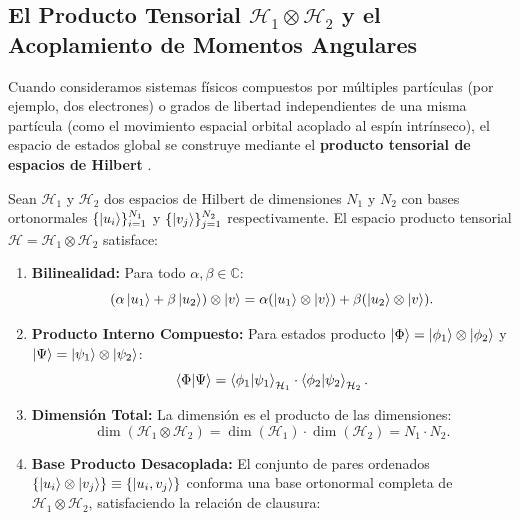 \subsection{El Producto Tensorial \texorpdfstring{$\mathcal{H}_1 \otimes \mathcal{H}_2$}{H1 x H2} y el Acoplamiento de Momentos Angulares}
\label{subsec:producto_tensorial_acoplamiento}

Cuando consideramos sistemas físicos compuestos por múltiples partículas (por ejemplo, dos electrones) o grados de libertad independientes de una misma partícula (como el movimiento espacial orbital acoplado al espín intrínseco), el espacio de estados global se construye mediante el \textbf{producto tensorial de espacios de Hilbert} \cite{sakurai, cohen}.

\begin{teoremabox}
    Sean $\mathcal{H}_1$ y $\mathcal{H}_2$ dos espacios de Hilbert de dimensiones $N_1$ y $N_2$ con bases ortonormales $\{\left| u_i \right\rangle\}_{i=1}^{N_1}$ y $\{\left| v_j \right\rangle\}_{j=1}^{N_2}$ respectivamente. El espacio producto tensorial $\mathcal{H} = \mathcal{H}_1 \otimes \mathcal{H}_2$ satisface:
    \begin{enumerate}
        \item \textbf{Bilinealidad:} Para todo $\alpha, \beta \in \mathbb{C}$:
        \begin{equation}
            (\alpha\left| u_1 \right\rangle + \beta\left| u_2 \right\rangle) \otimes \left| v \right\rangle = \alpha(\left| u_1 \right\rangle \otimes \left| v \right\rangle) + \beta(\left| u_2 \right\rangle \otimes \left| v \right\rangle).
        \end{equation}
        \item \textbf{Producto Interno Compuesto:} Para estados producto $\left| \Phi \right\rangle = \left| \phi_1 \right\rangle \otimes \left| \phi_2 \right\rangle$ y $\left| \Psi \right\rangle = \left| \psi_1 \right\rangle \otimes \left| \psi_2 \right\rangle$:
        \begin{equation}
            \left\langle \Phi \middle| \Psi \right\rangle = \left\langle \phi_1 \middle| \psi_1 \right\rangle_{\mathcal{H}_1} \cdot \left\langle \phi_2 \middle| \psi_2 \right\rangle_{\mathcal{H}_2}.
        \end{equation}
        \item \textbf{Dimensión Total:} La dimensión es el producto de las dimensiones:
        \begin{equation}
            \dim(\mathcal{H}_1 \otimes \mathcal{H}_2) = \dim(\mathcal{H}_1) \cdot \dim(\mathcal{H}_2) = N_1 \cdot N_2.
        \end{equation}
        \item \textbf{Base Producto Desacoplada:} El conjunto de pares ordenados $\{\left| u_i \right\rangle \otimes \left| v_j \right\rangle\} \equiv \{\left| u_i, v_j \right\rangle\}$ conforma una base ortonormal completa de $\mathcal{H}_1 \otimes \mathcal{H}_2$, satisfaciendo la relación de clausura:

\end{enumerate}
\end{teoremabox}
